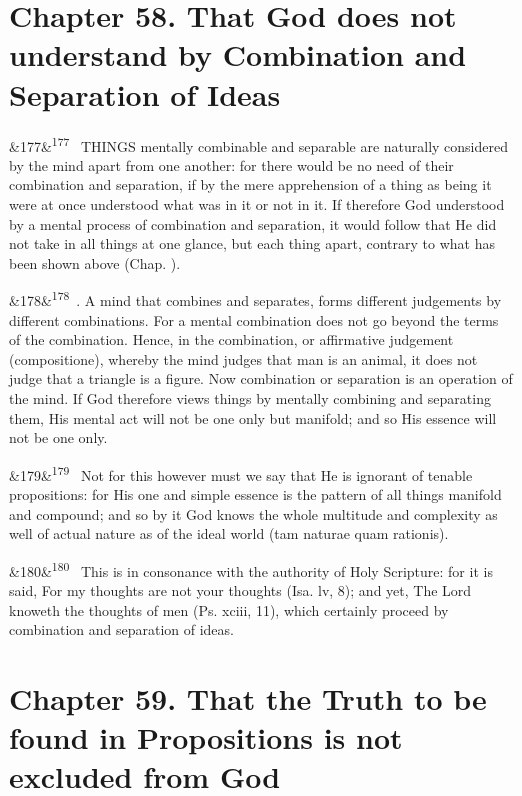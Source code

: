 \documentclass[12pt]{article}
\newcommand{\para}[1][]{\par\noindent\ifx&#1&\else\textsuperscript{\footnotesize #1}~\fi}
\begin{document}
\section*{Chapter 58. That God does not understand by Combination and Separation of Ideas}

\para[177] THINGS mentally combinable and separable are naturally considered by the mind apart from one another: for there would be no need of their combination and separation, if by the mere apprehension of a thing as being it were at once understood what was in it or not in it. If therefore God understood by a mental process of combination and separation, it would follow that He did not take in all things at one glance, but each thing apart, contrary to what has been shown above (Chap. ).

\para[178] 3. A mind that combines and separates, forms different judgements by different combinations. For a mental combination does not go beyond the terms of the combination. Hence, in the combination, or affirmative judgement (compositione), whereby the mind judges that man is an animal, it does not judge that a triangle is a figure. Now combination or separation is an operation of the mind. If God therefore views things by mentally combining and separating them, His mental act will not be one only but manifold; and so His essence will not be one only.

\para[179] Not for this however must we say that He is ignorant of tenable propositions: for His one and simple essence is the pattern of all things manifold and compound; and so by it God knows the whole multitude and complexity as well of actual nature as of the ideal world (tam naturae quam rationis).

\para[180] This is in consonance with the authority of Holy Scripture: for it is said, For my thoughts are not your thoughts (Isa. lv, 8); and yet, The Lord knoweth the thoughts of men (Ps. xciii, 11), which certainly proceed by combination and separation of ideas.

\section*{Chapter 59. That the Truth to be found in Propositions is not excluded from God}
\end{document}
